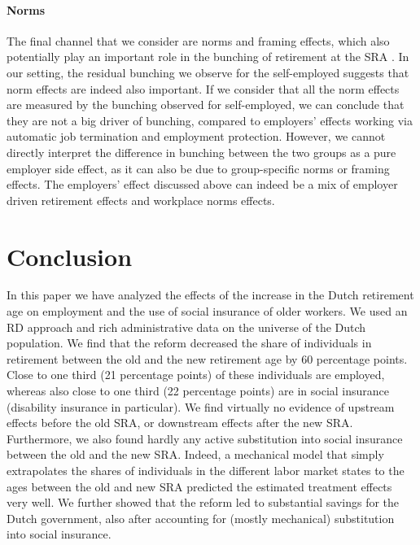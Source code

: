 \documentclass[12pt,a4paper]{article}
\begin{document}
\paragraph{Norms} The final channel that we consider are norms and framing effects, which also potentially play an important role in the bunching of retirement at the SRA \citep{behaghel_framing_2012, lalive2019raising, seibold2019reference}. In our setting, the residual bunching we observe for the self-employed suggests that norm effects are indeed also important. If we consider that all the norm effects are measured by the bunching observed for self-employed, we can conclude that they are not a big driver of bunching, compared to employers' effects working via automatic job termination and employment protection. However, we cannot directly interpret the difference in bunching between the two groups as a pure employer side effect, as it can also be due to group-specific norms or framing effects. The employers' effect discussed above can indeed be a mix of employer driven retirement effects and workplace norms effects.

\section{Conclusion} 

In this paper we have analyzed the effects of the increase in the Dutch retirement age on employment and the use of social insurance of older workers. We used an RD approach and rich administrative data on the universe of the Dutch population. We find that the reform decreased the share of individuals in retirement between the old and the new retirement age by 60 percentage points. Close to one third (21 percentage points) of these individuals are employed, whereas also close to one third (22 percentage points) are in social insurance (disability insurance in particular). We find virtually no evidence of upstream effects before the old SRA, or downstream effects after the new SRA. Furthermore, we also found hardly any active substitution into social insurance between the old and the new SRA. Indeed, a mechanical model that simply extrapolates the shares of individuals in the different labor market states to the ages between the old and new SRA predicted the estimated treatment effects very well. %
We further showed that the reform led to substantial savings for the Dutch government, also after accounting for (mostly mechanical) substitution into social insurance.
\end{document}
